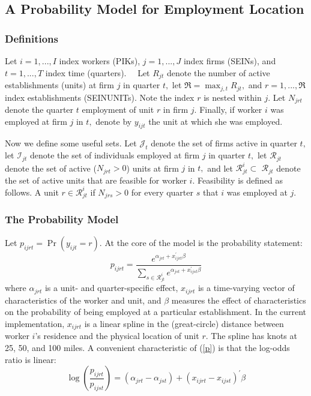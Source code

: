                       
%

\subsection{A Probability Model for Employment Location}

\subsubsection{Definitions}

Let $i=1,...,I$ index workers (PIKs), $j=1,...,J$ index firms (SEINs), and $%
t=1,...,T$ index time (quarters). \ \ Let $R_{jt}$ denote the number of
active establishments (units) at firm $j$ in quarter $t,$ let $\mathfrak{R}%
=\max_{j,t}R_{jt},$ and $r=1,...,\mathfrak{R}$ index establishments
(SEINUNITs). Note the index $r$ is nested within $j.$ Let $N_{jrt}$ denote
the quarter $t$ employment of unit $r$ in firm $j.$ Finally, if worker $i$
was employed at firm $j$ in $t,$ denote by $y_{ijt}$ the unit at which she
was employed$.$

Now we define some useful sets. Let $\mathcal{J}_{t}$ denote the set of
firms active in quarter $t,$ let $\mathcal{I}_{jt}$ denote the set of
individuals employed at firm $j$ in quarter $t,$ let $\mathcal{R}_{jt}$
denote the set of active ($N_{jrt}>0$) units at firm $j$ in $t,$ and let $%
\mathcal{R}_{jt}^{i}\subset $ $\mathcal{R}_{jt}$ denote the set of active
units that are feasible for worker $i$. Feasibility is defined as follows. A
unit $r\in \mathcal{R}_{jt}^{i}$ if $N_{jrs}>0$ for every quarter $s$ that $%
i $ was employed at $j.$

\subsubsection{The Probability Model}

Let $p_{ijrt}=\Pr \left( y_{ijt}=r\right) .$ At the core of the model is the
probability statement:%
\begin{equation}
p_{ijrt}=\frac{e^{\alpha _{jrt}+x_{ijrt}^{\prime }\beta }}{\sum_{s\in 
\mathcal{R}_{jt}^{i}}e^{\alpha _{jst}+x_{ijst}^{\prime }\beta }}  \label{p}
\end{equation}%
where $\alpha _{jrt}$ is a unit- and quarter-specific effect, $x_{ijrt}$ is
a time-varying vector of characteristics of the worker and unit, and $\beta $
measures the effect of characteristics on the probability of being employed
at a particular establishment. In the current implementation, $x_{ijrt}$ is
a linear spline in the (great-circle) distance between worker $i$'s
residence and the physical location of unit $r.$ The spline has knots at 25,
50, and 100 miles. A convenient characteristic of (\ref{p}) is that the
log-odds ratio is linear:%
\begin{equation}
\log \left( \frac{p_{ijrt}}{p_{ijst}}\right) =\left( \alpha _{jrt}-\alpha
_{jst}\right) +\left( x_{ijrt}-x_{ijst}\right) ^{\prime }\beta
\end{equation}

